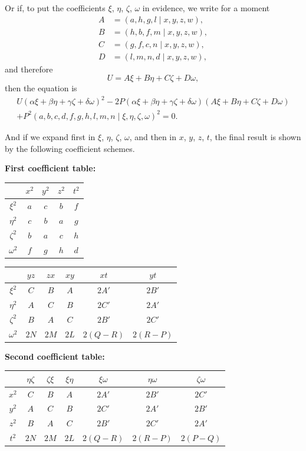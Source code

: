 \documentclass[12pt,a4paper]{article}
\theoremstyle{plain}
\begin{document}
Or if, to put the coefficients $\xi$, $\eta$, $\zeta$, $\omega$ in evidence, we write for a moment
\begin{align*}
A &= (a,h,g,l\mid x,y,z,w),\\
B &= (h,b,f,m\mid x,y,z,w),\\
C &= (g,f,c,n\mid x,y,z,w),\\
D &= (l,m,n,d\mid x,y,z,w),
\end{align*}
and therefore
\[
U = A\xi + B\eta + C\zeta + D\omega,
\]
then the equation is
\begin{multline*}
U(\alpha\xi+\beta\eta+\gamma\zeta+\delta\omega)^2
-2P(\alpha\xi+\beta\eta+\gamma\zeta+\delta\omega)(A\xi+B\eta+C\zeta+D\omega)\\
+P^2(a,b,c,d,f,g,h,l,m,n\mid\xi,\eta,\zeta,\omega)^2 = 0.
\end{multline*}

And if we expand first in $\xi$, $\eta$, $\zeta$, $\omega$, and then in $x$, $y$, $z$, $t$,
the final result is shown by the following coefficient schemes.

\begin{center}
\textbf{First coefficient table:}
\end{center}
\begin{center}
\begin{tabular}{c|cccc}
& $x^2$ & $y^2$ & $z^2$ & $t^2$ \\
\hline
$\xi^2$ & $a$ & $c$ & $b$ & $f$ \\
$\eta^2$ & $c$ & $b$ & $a$ & $g$ \\
$\zeta^2$ & $b$ & $a$ & $c$ & $h$ \\
$\omega^2$ & $f$ & $g$ & $h$ & $d$
\end{tabular}
\quad
\begin{tabular}{c|ccccc}
& $yz$ & $zx$ & $xy$ & $xt$ & $yt$ \\
\hline
$\xi^2$ & $C$ & $B$ & $A$ & $2A'$ & $2B'$ \\
$\eta^2$ & $A$ & $C$ & $B$ & $2C'$ & $2A'$ \\
$\zeta^2$ & $B$ & $A$ & $C$ & $2B'$ & $2C'$ \\
$\omega^2$ & $2N$ & $2M$ & $2L$ & $2(Q-R)$ & $2(R-P)$
\end{tabular}
\end{center}

\begin{center}
\textbf{Second coefficient table:}
\end{center}
\begin{center}
\begin{tabular}{c|cccccc}
& $\eta\zeta$ & $\zeta\xi$ & $\xi\eta$ & $\xi\omega$ & $\eta\omega$ & $\zeta\omega$ \\
\hline
$x^2$ & $C$ & $B$ & $A$ & $2A'$ & $2B'$ & $2C'$ \\
$y^2$ & $A$ & $C$ & $B$ & $2C'$ & $2A'$ & $2B'$ \\
$z^2$ & $B$ & $A$ & $C$ & $2B'$ & $2C'$ & $2A'$ \\
$t^2$ & $2N$ & $2M$ & $2L$ & $2(Q-R)$ & $2(R-P)$ & $2(P-Q)$
\end{tabular}
\end{center}
\end{document}
